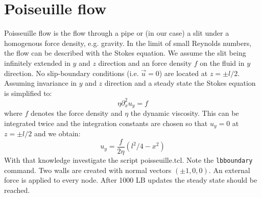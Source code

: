 \section{Poiseuille flow \ES{}}
Poisseuille flow is the flow through a pipe or (in our case) a slit
under a homogenous force density, e.g. gravity. In the limit of small Reynolds
numbers, the flow can be described with the Stokes equation. 
We assume the slit being infinitely extended in $y$ and $z$ 
direction and an force density $f$ on the fluid 
in $y$ direction. No slip-boundary conditions  (i.e. $\vec{u}=0$)
are located at $z = \pm l/2$.
Assuming invariance in $y$ and $z$ direction and a steady state 
the Stokes equation is simplified to:
\begin{equation}
  \eta \partial_x^2 u_y = f
\end{equation}
where $f$ denotes the force density and $\eta$ the dynamic viscosity.
This can be integrated twice and the integration constants are chosen
so that $u_y=0$ at $z = \pm l/2$ and we obtain:
\begin{equation}
  u_y = \frac{f}{2\eta} \left(l^2/4-x^2\right)
\end{equation}
With that knowledge investigate the script poisseuille.tcl.
Note the \lstinline{lbboundary} command. Two walls are created
with normal vectors $\left(\pm 1, 0, 0 \right)$. An external force
is applied to every node. After 1000 LB updates the steady state should
be reached.

